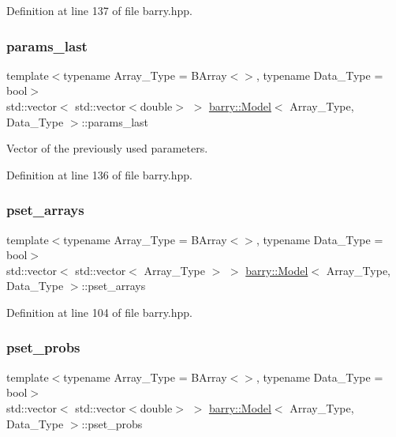 Definition at line 137 of file barry.\+hpp.

\mbox{\label{classbarry_1_1_model_a2fa6149fc084c16fbe70150b0954f293}} 
\subsubsection{\texorpdfstring{params\+\_\+last}{params\_last}}
{\footnotesize\ttfamily template$<$typename Array\+\_\+\+Type  = B\+Array$<$$>$, typename Data\+\_\+\+Type  = bool$>$ \\
std\+::vector$<$ std\+::vector$<$double$>$ $>$ \hyperlink{classbarry_1_1_model}{barry\+::\+Model}$<$ Array\+\_\+\+Type, Data\+\_\+\+Type $>$\+::params\+\_\+last}



Vector of the previously used parameters. 



Definition at line 136 of file barry.\+hpp.

\mbox{\label{classbarry_1_1_model_aafa28c9a165e67071c262ae8eecd3f87}} 
\subsubsection{\texorpdfstring{pset\+\_\+arrays}{pset\_arrays}}
{\footnotesize\ttfamily template$<$typename Array\+\_\+\+Type  = B\+Array$<$$>$, typename Data\+\_\+\+Type  = bool$>$ \\
std\+::vector$<$ std\+::vector$<$ Array\+\_\+\+Type $>$ $>$ \hyperlink{classbarry_1_1_model}{barry\+::\+Model}$<$ Array\+\_\+\+Type, Data\+\_\+\+Type $>$\+::pset\+\_\+arrays}



Definition at line 104 of file barry.\+hpp.

\mbox{\label{classbarry_1_1_model_a60359b14f0f5962c1c635b9dcbd42805}} 
\subsubsection{\texorpdfstring{pset\+\_\+probs}{pset\_probs}}
{\footnotesize\ttfamily template$<$typename Array\+\_\+\+Type  = B\+Array$<$$>$, typename Data\+\_\+\+Type  = bool$>$ \\
std\+::vector$<$ std\+::vector$<$double$>$ $>$ \hyperlink{classbarry_1_1_model}{barry\+::\+Model}$<$ Array\+\_\+\+Type, Data\+\_\+\+Type $>$\+::pset\+\_\+probs}



